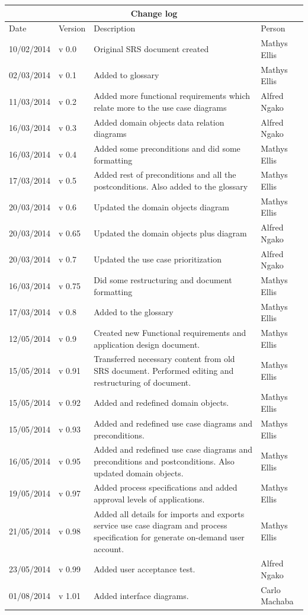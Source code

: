 \documentclass[12pt]{article}
\begin{document}
\begin{center}
\begin{tabular}{|l|p{1.4cm}|p{8cm}|p{2.8cm}|}
\hline
\multicolumn{4}{|c|}{\bf Change log} \\
\hline
 Date & Version & Description &  Person \\
\hline
10/02/2014 & v 0.0 & Original SRS document created & Mathys Ellis \\
\hline
02/03/2014 & v 0.1 & Added to glossary & Mathys Ellis \\
\hline
11/03/2014 & v 0.2 & Added more functional requirements which relate more to the use case diagrams & Alfred Ngako \\
\hline
16/03/2014 & v 0.3 & Added domain objects data relation diagrams & Alfred Ngako \\
\hline
16/03/2014 & v 0.4 & Added some preconditions and did some formatting & Mathys Ellis \\
\hline
17/03/2014 & v 0.5 & Added rest of preconditions and all the postconditions. Also added to the glossary & Mathys Ellis \\
\hline
20/03/2014 & v 0.6 & Updated the domain objects diagram  & Mathys Ellis \\
\hline
20/03/2014 & v 0.65 & Updated the domain objects plus diagram  & Alfred Ngako \\
\hline
20/03/2014 & v 0.7 & Updated the use case prioritization  & Alfred Ngako \\
\hline
16/03/2014 & v 0.75 & Did some restructuring and document formatting & Mathys Ellis \\
\hline
17/03/2014 & v 0.8 & Added to the glossary & Mathys Ellis \\
\hline
12/05/2014 & v 0.9 & Created new Functional requirements and application design document. & Mathys Ellis \\
\hline
15/05/2014 & v 0.91 & Transferred necessary content from old SRS document. Performed editing and restructuring of document. & Mathys Ellis \\
\hline
15/05/2014 & v 0.92 & Added and redefined domain objects. & Mathys Ellis \\
\hline
15/05/2014 & v 0.93 & Added and redefined use case diagrams and preconditions. & Mathys Ellis \\
\hline
16/05/2014 & v 0.95 & Added and redefined use case diagrams and preconditions and postconditions. Also updated domain objects. & Mathys Ellis \\
\hline
19/05/2014 & v 0.97 & Added process specifications and added approval levels of applications. & Mathys Ellis \\
\hline
21/05/2014 & v 0.98 & Added all details for imports and exports service use case diagram and process specification for generate on-demand user account. & Mathys Ellis \\
\hline
23/05/2014 & v 0.99 & Added user acceptance test. & Alfred Ngako \\
\hline
01/08/2014 & v 1.01 & Added interface diagrams. & Carlo Machaba \\
\hline

\end{tabular}
\end{center}
\end{document}

